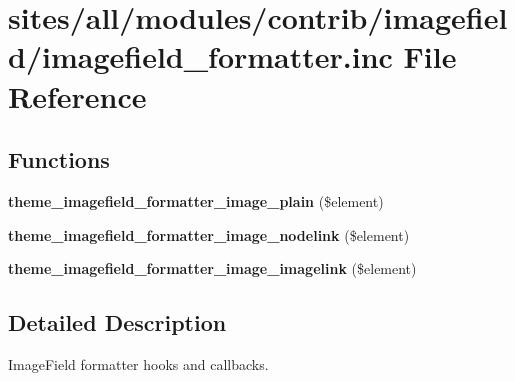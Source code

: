 \hypertarget{imagefield__formatter_8inc}{
\section{sites/all/modules/contrib/imagefield/imagefield\_\-formatter.inc File Reference}
\label{imagefield__formatter_8inc}
}
\subsection*{Functions}
\begin{CompactItemize}
\item 
\hypertarget{imagefield__formatter_8inc_9130e196dcf1e50b4f4eed4c37da7cd1}{
\textbf{theme\_\-imagefield\_\-formatter\_\-image\_\-plain} (\$element)}
\label{imagefield__formatter_8inc_9130e196dcf1e50b4f4eed4c37da7cd1}

\item 
\hypertarget{imagefield__formatter_8inc_37e71d43b8e6e9973b00a08adcd96052}{
\textbf{theme\_\-imagefield\_\-formatter\_\-image\_\-nodelink} (\$element)}
\label{imagefield__formatter_8inc_37e71d43b8e6e9973b00a08adcd96052}

\item 
\hypertarget{imagefield__formatter_8inc_3b012a40af5548787c37e9f82131e597}{
\textbf{theme\_\-imagefield\_\-formatter\_\-image\_\-imagelink} (\$element)}
\label{imagefield__formatter_8inc_3b012a40af5548787c37e9f82131e597}

\end{CompactItemize}


\subsection{Detailed Description}
ImageField formatter hooks and callbacks. 